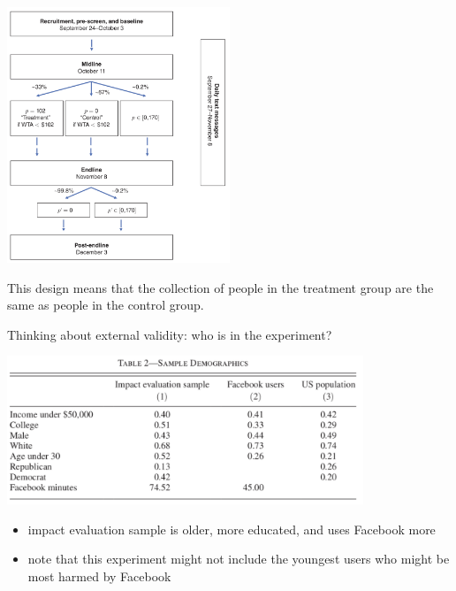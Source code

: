 \documentclass[aspectratio=169]{beamer}
\begin{document}
\begin{frame}

\begin{center}
\includegraphics[width=0.5\textwidth]{figures/allcott_welfare_2020_fig1}
\end{center}

This design means that the collection of people in the treatment group are the same as people in the control group.


\end{frame}
\begin{frame}

Thinking about external validity: who is in the experiment? \pause

\begin{center}
\includegraphics[width=0.8\textwidth]{figures/allcott_welfare_2020_tab2}
\end{center}

\begin{itemize}
\item impact evaluation sample is older, more educated, and uses Facebook more
\item note that this experiment might not include the youngest users who might be most harmed by Facebook
\end{itemize}

\end{frame}
\end{document}
